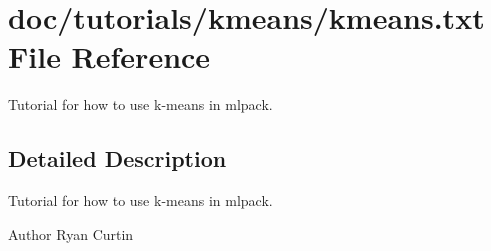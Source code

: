 \section{doc/tutorials/kmeans/kmeans.txt File Reference}
\label{kmeans_8txt}


Tutorial for how to use k-\/means in mlpack.  




\subsection{Detailed Description}
Tutorial for how to use k-\/means in mlpack. 

\begin{DoxyAuthor}{Author}
Ryan Curtin 
\end{DoxyAuthor}
